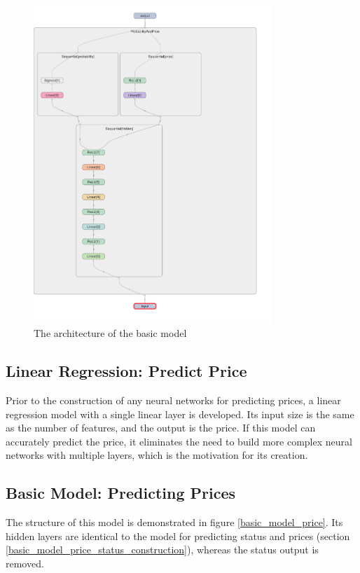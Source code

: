 \documentclass[12pt,twoside]{report}
\begin{document}
\begin{figure}[!htbp]
	\centering
	\includegraphics[height=12cm]{basic_model_layout}
	\caption{The architecture of the basic model}
	\label{basic_model_layout}
\end{figure}

\subsection{Linear Regression: Predict Price}
\label{linear_regression_model_construction}
Prior to the construction of any neural networks for predicting prices, a linear regression model with a single linear layer is developed. Its input size is the same as the number of features, and the output is the price. If this model can accurately predict the price, it eliminates the need to build more complex neural networks with multiple layers, which is the motivation for its creation. 

\subsection{Basic Model: Predicting Prices}
The structure of this model is demonstrated in figure \ref{basic_model_price}. Its hidden layers are identical to the model for predicting status and prices (section \ref{basic_model_price_status_construction}), whereas the status output is removed.
\end{document}
